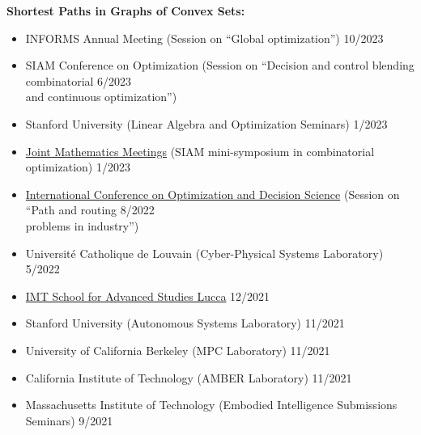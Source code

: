 \documentclass[11pt,a4paper,sans]{moderncv}
\begin{document}
\textbf{Shortest Paths in Graphs of Convex Sets:}

\vspace{5pt}

\begin{itemize}

\item
INFORMS Annual Meeting (Session on ``Global optimization'') \hfill 10/2023

\item
SIAM Conference on Optimization (Session on ``Decision and control blending combinatorial \hfill 6/2023 \\ and continuous optimization'')

\item
Stanford University (Linear Algebra and Optimization Seminars) \hfill 1/2023

\item \href{https://www.jointmathematicsmeetings.org/meetings/national/jmm2023/2270_program.html}{\color{cyan}Joint Mathematics Meetings} (SIAM mini-symposium in combinatorial optimization)  \hfill 1/2023

\item \href{http://www.airoconference.it/ods2022/}{\color{cyan}International Conference on Optimization and Decision Science} (Session on ``Path and routing \hfill 8/2022 \\ problems in industry'') 


\item Universit\'e Catholique de Louvain (Cyber-Physical Systems Laboratory) \hfill 5/2022

\item \href{https://www.imtlucca.it/en/eventonew/shortest-paths-graphs-of-convex-sets}{\color{cyan}IMT School for Advanced Studies Lucca} \hfill 12/2021

\item Stanford University (Autonomous Systems Laboratory) \hfill 11/2021

\item University of California Berkeley (MPC Laboratory) \hfill 11/2021

\item California Institute of Technology (AMBER Laboratory) \hfill 11/2021

\item Massachusetts Institute of Technology (Embodied Intelligence Submissions Seminars) \hfill 9/2021


\end{itemize}
\end{document}
